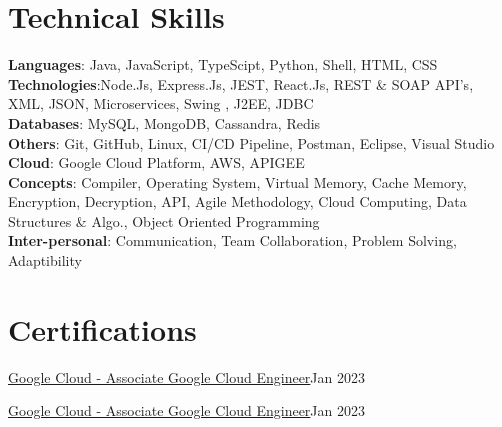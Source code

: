 \section{Technical Skills}
    \begin{itemize}[leftmargin=0.15in, label={}]
	\small{\item{
		\textbf{Languages}{: Java, JavaScript, TypeScipt, Python, Shell, HTML, CSS } \\
		\textbf{Technologies}{:Node.Js, Express.Js, JEST, React.Js, REST \& SOAP API’s, XML, JSON, Microservices, Swing , J2EE, JDBC } \\
		\textbf{Databases}{: MySQL, MongoDB, Cassandra, Redis }\\
        \textbf{Others}{: Git, GitHub, Linux, CI/CD Pipeline, Postman, Eclipse, Visual Studio }\\
        \textbf{Cloud}{: Google Cloud Platform, AWS, APIGEE}\\
        \textbf{Concepts}{: Compiler, Operating System, Virtual Memory, Cache Memory, Encryption, Decryption, API, Agile Methodology, Cloud Computing, Data Structures \& Algo., Object Oriented Programming }\\
\textbf{Inter-personal}{: Communication, Team Collaboration, Problem Solving, Adaptibility }\\
	}}
    \end{itemize}
\section{Certifications}
  \resumeSubheading
    {\href{https://www.credly.com/badges/31bfe8a0-1de2-45f5-8b9c-2ddf343b76ae/public_url}{Google Cloud - Associate Google Cloud Engineer}}{Jan 2023}

    \resumeItem{}
 \resumeSubheading
    {\href{https://www.credly.com/badges/31bfe8a0-1de2-45f5-8b9c-2ddf343b76ae/public_url}{Google Cloud - Associate Google Cloud Engineer}}{Jan 2023}
